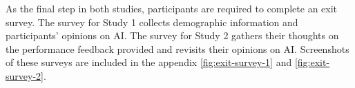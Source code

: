 As the final step in both studies, participants are required to complete an exit survey. The survey for Study 1 collects demographic information and participants' opinions on AI. The survey for Study 2 gathers their thoughts on the performance feedback provided and revisits their opinions on AI. Screenshots of these surveys are included in the appendix \cref{fig:exit-survey-1} and \cref{fig:exit-survey-2}.



